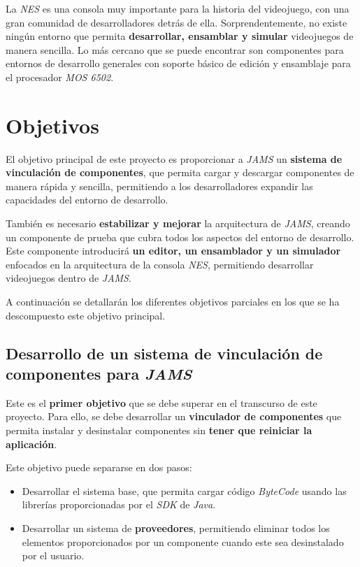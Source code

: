 La \textit{NES} es una consola muy importante para la historia
del videojuego, con una gran comunidad de desarrolladores detrás
de ella.
Sorprendentemente, no existe ningún entorno que permita
\textbf{desarrollar, ensamblar y simular} videojuegos de manera sencilla.
Lo más cercano que se puede encontrar son componentes
para entornos de desarrollo generales con soporte básico de edición y
ensamblaje para el procesador \textit{MOS 6502}.


\section{Objetivos}\label{sec:objetivos}

El objetivo principal de este proyecto es proporcionar a \textit{JAMS}
un \textbf{sistema de vinculación de componentes}, que permita cargar
y descargar componentes de manera rápida y sencilla, permitiendo
a los desarrolladores expandir las capacidades del entorno de desarrollo.

También es necesario \textbf{estabilizar y mejorar}
la arquitectura de \textit{JAMS}, creando un componente
de prueba que cubra todos los aspectos del entorno de desarrollo.
Este componente introducirá \textbf{un editor, un ensamblador y un simulador}
enfocados en la arquitectura de la consola \textit{NES}, permitiendo
desarrollar videojuegos dentro de \textit{JAMS}.

A continuación se detallarán los diferentes objetivos parciales en los
que se ha descompuesto este objetivo principal.

\subsection{Desarrollo de un sistema de vinculación de componentes para \textit{JAMS}}
\label{subsec:desarrollo-de-un-sistema-de-vinculacion-de-componentes-para-jams}

Este es el \textbf{primer objetivo} que se debe superar en el transcurso de este
proyecto.
Para ello, se debe desarrollar un \textbf{vinculador de componentes} que permita
instalar y desinstalar componentes sin \textbf{tener que reiniciar la aplicación}.

\noexpand Este objetivo puede separarse en dos pasos:
\begin{itemize}
    \item Desarrollar el sistema base, que permita cargar código \textit{ByteCode}
    usando las librerías proporcionadas por el \textit{SDK} de \textit{Java}.
    \item Desarrollar un sistema de \textbf{proveedores}, permitiendo
    eliminar todos los elementos proporcionados por un componente
    cuando este sea desinstalado por el usuario.
\end{itemize}

